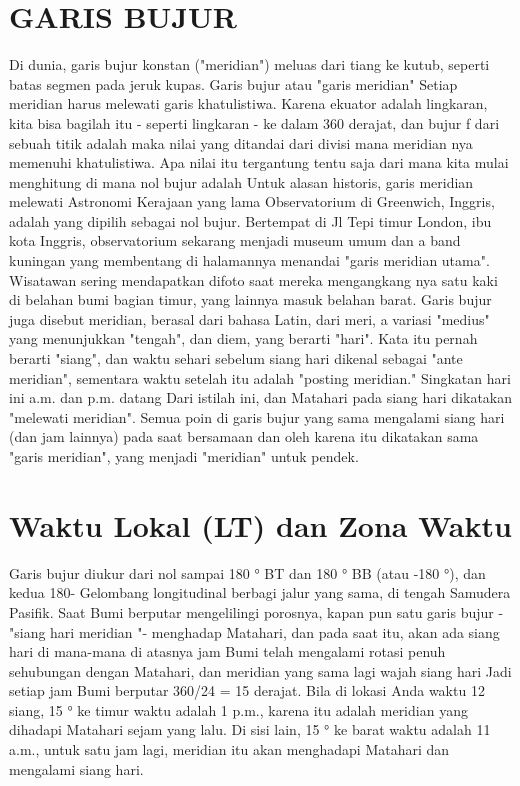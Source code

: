 \section{GARIS BUJUR}
	Di dunia, garis bujur konstan ("meridian") meluas dari tiang ke kutub, seperti
	batas segmen pada jeruk kupas.
	Garis bujur atau "garis meridian"
	Setiap meridian harus melewati garis khatulistiwa. Karena ekuator adalah lingkaran, kita bisa
	bagilah itu - seperti lingkaran - ke dalam 360 derajat, dan bujur f dari sebuah titik adalah
	maka nilai yang ditandai dari divisi mana meridian nya memenuhi khatulistiwa.
	Apa nilai itu tergantung tentu saja dari mana kita mulai menghitung di mana
	nol bujur adalah Untuk alasan historis, garis meridian melewati Astronomi Kerajaan yang lama
	Observatorium di Greenwich, Inggris, adalah yang dipilih sebagai nol bujur. Bertempat di Jl
	Tepi timur London, ibu kota Inggris, observatorium sekarang menjadi museum umum dan a
	band kuningan yang membentang di halamannya menandai "garis meridian utama". Wisatawan sering mendapatkan
	difoto saat mereka mengangkang nya satu kaki di belahan bumi bagian timur, yang lainnya masuk belahan barat.
	Garis bujur juga disebut meridian, berasal dari bahasa Latin, dari meri, a
	variasi "medius" yang menunjukkan "tengah", dan diem, yang berarti "hari". Kata itu
	pernah berarti "siang", dan waktu sehari sebelum siang hari dikenal sebagai "ante meridian",
	sementara waktu setelah itu adalah "posting meridian." Singkatan hari ini a.m. dan p.m. datang
	Dari istilah ini, dan Matahari pada siang hari dikatakan "melewati meridian". Semua poin di
	garis bujur yang sama mengalami siang hari (dan jam lainnya) pada saat bersamaan dan
	oleh karena itu dikatakan sama "garis meridian", yang menjadi "meridian" untuk
	pendek.

\section{Waktu Lokal (LT) dan Zona Waktu}
	Garis bujur diukur dari nol sampai 180 ° BT dan 180 ° BB (atau -180 °), dan kedua 180-
	Gelombang longitudinal berbagi jalur yang sama, di tengah Samudera Pasifik.
	Saat Bumi berputar mengelilingi porosnya, kapan pun satu garis bujur - "siang hari
	meridian "- menghadap Matahari, dan pada saat itu, akan ada siang hari di mana-mana di atasnya
	jam Bumi telah mengalami rotasi penuh sehubungan dengan Matahari, dan meridian yang sama
	lagi wajah siang hari Jadi setiap jam Bumi berputar 360/24 = 15 derajat.
	Bila di lokasi Anda waktu 12 siang, 15 ° ke timur waktu adalah 1 p.m., karena itu adalah
	meridian yang dihadapi Matahari sejam yang lalu. Di sisi lain, 15 ° ke barat waktu adalah 11
	a.m., untuk satu jam lagi, meridian itu akan menghadapi Matahari dan mengalami siang hari.

